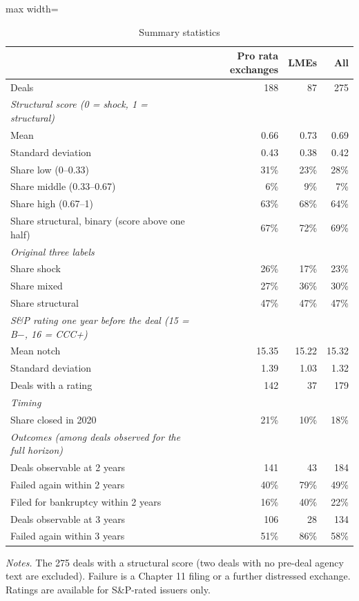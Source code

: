 \begin{table}[H]
\centering
\caption{Summary statistics}
\label{tab:sumstats}
\small
\begin{adjustbox}{max width=\textwidth}
\begin{tabular}{l r r r}
\toprule
 & Pro rata exchanges & LMEs & All \\
\midrule
Deals & 188 & 87 & 275 \\
\addlinespace \textit{Structural score (0 = shock, 1 = structural)} & & & \\
\quad Mean & 0.66 & 0.73 & 0.69 \\
\quad Standard deviation & 0.43 & 0.38 & 0.42 \\
\quad Share low (0--0.33) & 31\% & 23\% & 28\% \\
\quad Share middle (0.33--0.67) & 6\% & 9\% & 7\% \\
\quad Share high (0.67--1) & 63\% & 68\% & 64\% \\
\quad Share structural, binary (score above one half) & 67\% & 72\% & 69\% \\
\addlinespace \textit{Original three labels} & & & \\
\quad Share shock & 26\% & 17\% & 23\% \\
\quad Share mixed & 27\% & 36\% & 30\% \\
\quad Share structural & 47\% & 47\% & 47\% \\
\addlinespace \textit{S\&P rating one year before the deal (15 = B$-$, 16 = CCC+)} & & & \\
\quad Mean notch & 15.35 & 15.22 & 15.32 \\
\quad Standard deviation & 1.39 & 1.03 & 1.32 \\
\quad Deals with a rating & 142 & 37 & 179 \\
\addlinespace \textit{Timing} & & & \\
\quad Share closed in 2020 & 21\% & 10\% & 18\% \\
\addlinespace \textit{Outcomes (among deals observed for the full horizon)} & & & \\
\quad Deals observable at 2 years & 141 & 43 & 184 \\
\quad\quad Failed again within 2 years & 40\% & 79\% & 49\% \\
\quad\quad Filed for bankruptcy within 2 years & 16\% & 40\% & 22\% \\
\quad Deals observable at 3 years & 106 & 28 & 134 \\
\quad\quad Failed again within 3 years & 51\% & 86\% & 58\% \\
\bottomrule
\end{tabular}
\end{adjustbox}
\begin{minipage}{0.9\textwidth}\vspace{4pt}\footnotesize
\textit{Notes.} The 275 deals with a structural score (two deals with no pre-deal agency text are excluded). Failure is a Chapter 11 filing or a further distressed exchange. Ratings are available for S\&P-rated issuers only.
\end{minipage}
\end{table}
